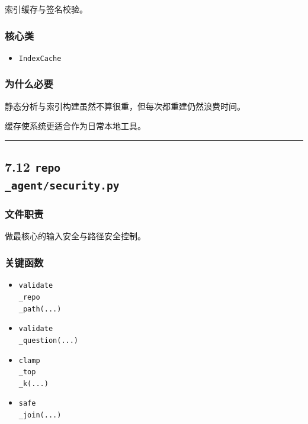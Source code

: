 \documentclass[UTF8,12pt,openany]{ctexbook}
\begin{document}
索引缓存与签名校验。\par

\subsubsection{核心类}

\begin{itemize}
\item \texttt{IndexCache}
\end{itemize}

\subsubsection{为什么必要}

静态分析与索引构建虽然不算很重，但每次都重建仍然浪费时间。  \par
缓存使系统更适合作为日常本地工具。\par

\hrule

\subsection{7.12 \texttt{repo\\_agent/security.py}}

\subsubsection{文件职责}

做最核心的输入安全与路径安全控制。\par

\subsubsection{关键函数}

\begin{itemize}
\item \texttt{validate\\_repo\\_path(...)}
\item \texttt{validate\\_question(...)}
\item \texttt{clamp\\_top\\_k(...)}
\item \texttt{safe\\_join(...)}
\end{itemize}
\end{document}
